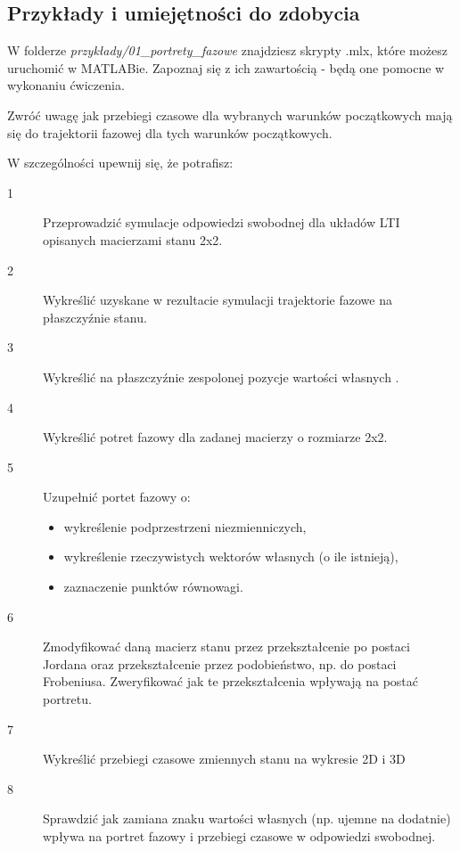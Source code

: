 \documentclass{sprawozdanie-agh}
\begin{document}
\subsection{Przykłady i umiejętności do zdobycia}
W folderze \textit{przykłady/01_portrety_fazowe} znajdziesz skrypty .mlx, które możesz uruchomić w MATLABie. Zapoznaj się z ich zawartością - będą one pomocne w wykonaniu ćwiczenia. 

Zwróć uwagę jak przebiegi czasowe dla wybranych warunków początkowych mają się do trajektorii fazowej dla tych warunków początkowych.


W szczególności upewnij się, że potrafisz:
\begin{description}
\item[1] Przeprowadzić symulacje odpowiedzi swobodnej dla układów LTI opisanych macierzami stanu 2x2.
\item[2] Wykreślić uzyskane w rezultacie symulacji trajektorie fazowe na płaszczyźnie stanu.
\item[3] Wykreślić na płaszczyźnie zespolonej pozycje wartości własnych .
\item[4] Wykreślić potret fazowy dla zadanej macierzy o rozmiarze 2x2.
\item[5] Uzupełnić portet fazowy o:
\begin{itemize}
\item wykreślenie podprzestrzeni niezmienniczych,
\item wykreślenie rzeczywistych wektorów własnych (o ile istnieją),
\item zaznaczenie punktów równowagi.
\end{itemize}

\item[6] Zmodyfikować daną macierz stanu przez przekształcenie po postaci Jordana oraz przekształcenie przez podobieństwo, np. do postaci Frobeniusa. Zweryfikować jak te przekształcenia wpływają na postać portretu.

\item[7] Wykreślić przebiegi czasowe zmiennych stanu na wykresie 2D i 3D

\item[8] Sprawdzić jak zamiana znaku wartości własnych (np. ujemne na dodatnie) wpływa na portret fazowy i przebiegi czasowe w odpowiedzi swobodnej.

\end{description}

\vspace{0.5cm}
\par
\end{document}
